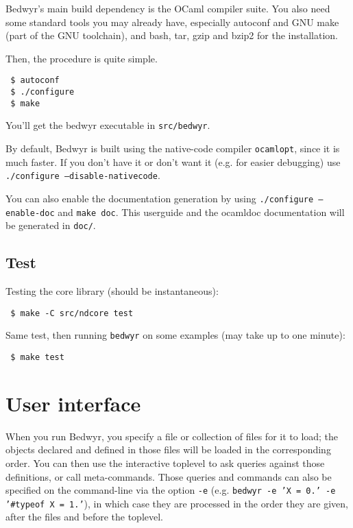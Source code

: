 \documentclass{article}
\begin{document}
Bedwyr's main build dependency is the OCaml compiler suite.
You also need some standard tools you may already have, especially
autoconf and GNU make (part of the GNU toolchain),
and bash, tar, gzip and bzip2 for the installation.

Then, the procedure is quite simple.

\begin{verbatim}
 $ autoconf
 $ ./configure
 $ make
\end{verbatim}

You'll get the bedwyr executable in \texttt{src/bedwyr}.

By default, Bedwyr is built using the native-code compiler \texttt{ocamlopt},
since it is much faster. If you don't have it or don't want it (e.g.
for easier debugging) use \texttt{./configure --disable-nativecode}.

You can also enable the documentation generation by using
\texttt{./configure --enable-doc} and \texttt{make doc}. This userguide
and the ocamldoc documentation will be generated in \texttt{doc/}.

\subsection{Test}

Testing the core library (should be instantaneous):
\begin{verbatim}
 $ make -C src/ndcore test
\end{verbatim}
Same test, then running {\tt bedwyr} on some examples (may take up to
one minute):
\begin{verbatim}
 $ make test
\end{verbatim}


\section{User interface}

When you run Bedwyr, you specify a file or collection of files for it to
load; the objects declared and defined in those files will be loaded in
the corresponding order. You can then use the interactive toplevel to
ask queries against those definitions, or call meta-commands.
Those queries and commands can also be specified on the command-line via
the option \verb.-e. (e.g.
\texttt{bedwyr -e 'X = 0.' -e '\#typeof X = 1.'}), in which case they are
processed in the order they are given, after the files and before the
toplevel.
\end{document}
